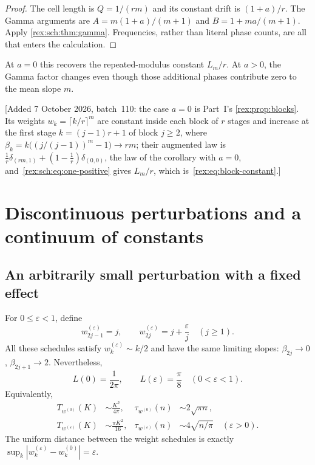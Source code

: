 \begin{proof}
The cell length is $Q=1/(rm)$ and its constant drift is $(1+a)/r$.
The Gamma arguments are $A=m(1+a)/(m+1)$ and $B=1+ma/(m+1)$.
Apply \cref{rex:sch:thm:gamma}. Frequencies, rather than literal phase
counts, are all that enters the calculation.
\end{proof}

At $a=0$ this recovers the repeated-modulus constant $L_m/r$.
At $a>0$, the Gamma factor changes even though those additional
phases contribute zero to the mean slope $m$.

[Added 7 October 2026, batch~110: the case $a=0$ is Part~I's
\cref{rex:prop:blocks}. Its weights $w_k=\lceil k/r\rceil^m$ are constant
inside each block of $r$ stages and increase at the first stage $k=(j-1)r+1$
of block $j\geq2$, where $\beta_k=k\bigl((j/(j-1))^m-1\bigr)\to rm$; their
augmented law is $\frac1r\delta_{(rm,1)}+(1-\frac1r)\delta_{(0,0)}$, the law
of the corollary with $a=0$, and~\eqref{rex:sch:eq:one-positive} gives
$L_m/r$, which is~\eqref{rex:eq:block-constant}.]

\section{Discontinuous perturbations and a continuum of constants}
\label{rex:sch:sec:instability}

\subsection{An arbitrarily small perturbation with a fixed effect}

\begin{theorem}\label{rex:sch:thm:jump}
For $0\leq\varepsilon<1$, define
\begin{equation}\label{rex:sch:eq:epsilon-weights}
 w_{2j-1}^{(\varepsilon)}=j,\qquad
 w_{2j}^{(\varepsilon)}=j+\frac{\varepsilon}{j}
 \quad(j\geq1).
\end{equation}
All these schedules satisfy $w_k^{(\varepsilon)}\sim k/2$ and have the
same limiting slopes: $\beta_{2j}\to0$, $\beta_{2j+1}\to2$.
Nevertheless,
\begin{equation}\label{rex:sch:eq:epsilon-L}
 L(0)=\frac{1}{2\pi},\qquad
 L(\varepsilon)=\frac{\pi}{8}\quad(0<\varepsilon<1).
\end{equation}
Equivalently,
\begin{align}
 T_{w^{(0)}}(K)&\sim\frac{K^2}{4\pi},&
 \tau_{w^{(0)}}(n)&\sim2\sqrt{\pi n},\label{rex:sch:eq:plateau-law}\\
 T_{w^{(\varepsilon)}}(K)&\sim\frac{\pi K^2}{16},&
 \tau_{w^{(\varepsilon)}}(n)&\sim4\sqrt{n/\pi}
 \quad(\varepsilon>0).\label{rex:sch:eq:active-law}
\end{align}
The uniform distance between the weight schedules is exactly
$\sup_k|w_k^{(\varepsilon)}-w_k^{(0)}|=\varepsilon$.
\end{theorem}


